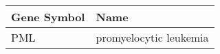 \begin{tabular}{ll}
\toprule
Gene Symbol &                   Name \\
\midrule
        PML & promyelocytic leukemia \\
\bottomrule
\end{tabular}
